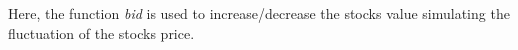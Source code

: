 Here, the function {\it bid} is used to increase/decrease the stocks value simulating the fluctuation of the stocks price.
%
%
%
